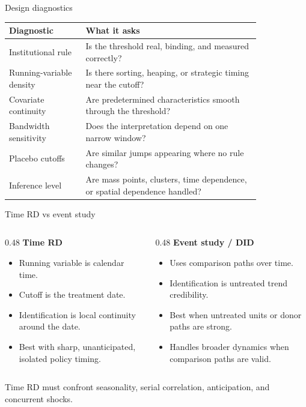 \documentclass[aspectratio=169,11pt]{beamer}
\newcommand{\1}{\mathbf{1}}
\begin{document}
\begin{frame}{Design diagnostics}
\small
\begin{tabular}{p{0.25\linewidth} p{0.58\linewidth}}
\toprule
Diagnostic & What it asks \\
\midrule
Institutional rule & Is the threshold real, binding, and measured correctly? \\
Running-variable density & Is there sorting, heaping, or strategic timing near the cutoff? \\
Covariate continuity & Are predetermined characteristics smooth through the threshold? \\
Bandwidth sensitivity & Does the interpretation depend on one narrow window? \\
Placebo cutoffs & Are similar jumps appearing where no rule changes? \\
Inference level & Are mass points, clusters, time dependence, or spatial dependence handled? \\
\bottomrule
\end{tabular}
\end{frame}

\begin{frame}{Time RD vs event study}
\begin{columns}[T,onlytextwidth]
\begin{column}{0.48\linewidth}
\textbf{Time RD}
\begin{itemize}
    \item Running variable is calendar time.
    \item Cutoff is the treatment date.
    \item Identification is local continuity around the date.
    \item Best with sharp, unanticipated, isolated policy timing.
\end{itemize}
\end{column}
\begin{column}{0.48\linewidth}
\textbf{Event study / DID}
\begin{itemize}
    \item Uses comparison paths over time.
    \item Identification is untreated trend credibility.
    \item Best when untreated units or donor paths are strong.
    \item Handles broader dynamics when comparison paths are valid.
\end{itemize}
\end{column}
\end{columns}

\medskip
Time RD must confront seasonality, serial correlation, anticipation, and concurrent shocks.
\end{frame}
\end{document}
